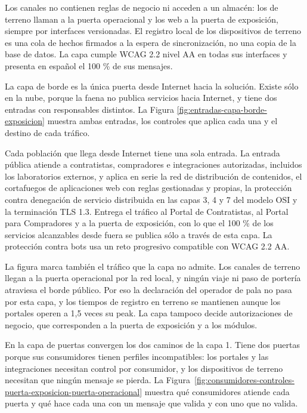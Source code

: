 \documentclass[subdoc]{../../comun/overfore}
\begin{document}
Los canales no contienen reglas de negocio ni acceden a un almacén: los de terreno llaman a la puerta operacional y los web a la puerta de exposición, siempre por interfaces versionadas. El registro local de los dispositivos de terreno es una cola de hechos firmados a la espera de sincronización, no una copia de la base de datos. La capa cumple WCAG 2.2 nivel AA en todas sus interfaces y presenta en español el 100 \% de sus mensajes.

La capa de borde es la única puerta desde Internet hacia la solución. Existe sólo en la nube, porque la faena no publica servicios hacia Internet, y tiene dos entradas con responsables distintos. La Figura \ref{fig:entradas-capa-borde-exposicion} muestra ambas entradas, los controles que aplica cada una y el destino de cada tráfico.

\begin{horizontal}
\end{horizontal}
Cada población que llega desde Internet tiene una sola entrada. La entrada pública atiende a contratistas, compradores e integraciones autorizadas, incluidos los laboratorios externos, y aplica en serie la red de distribución de contenidos, el cortafuegos de aplicaciones web con reglas gestionadas y propias, la protección contra denegación de servicio distribuida en las capas 3, 4 y 7 del modelo OSI y la terminación TLS 1.3. Entrega el tráfico al Portal de Contratistas, al Portal para Compradores y a la puerta de exposición, con lo que el 100 \% de los servicios alcanzables desde fuera se publica sólo a través de esta capa. La protección contra bots usa un reto progresivo compatible con WCAG 2.2 AA.

La figura marca también el tráfico que la capa no admite. Los canales de terreno llegan a la puerta operacional por la red local, y ningún viaje ni paso de portería atraviesa el borde público. Por eso la declaración del operador de pala no pasa por esta capa, y los tiempos de registro en terreno se mantienen aunque los portales operen a 1,5 veces su peak. La capa tampoco decide autorizaciones de negocio, que corresponden a la puerta de exposición y a los módulos.

En la capa de puertas convergen los dos caminos de la capa 1. Tiene dos puertas porque sus consumidores tienen perfiles incompatibles: los portales y las integraciones necesitan control por consumidor, y los dispositivos de terreno necesitan que ningún mensaje se pierda. La Figura~\ref{fig:consumidores-controles-puerta-exposicion-puerta-operacional} muestra qué consumidores atiende cada puerta y qué hace cada una con un mensaje que valida y con uno que no valida.
\end{document}
